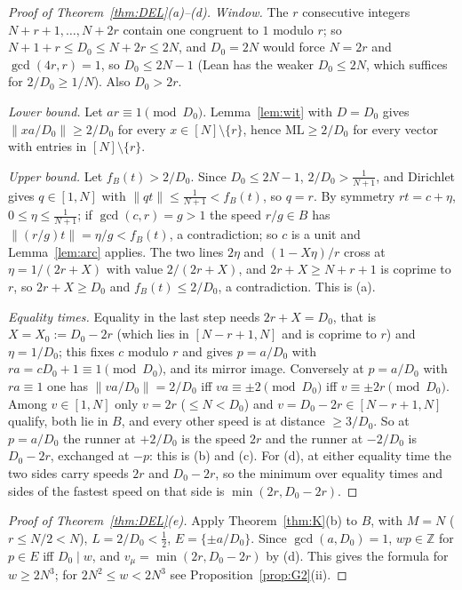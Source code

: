 \documentclass[11pt]{article}
\theoremstyle{definition}
\theoremstyle{remark}
\newcommand{\nd}[1]{\lVert #1\rVert}
\newcommand{\ML}{\mathrm{ML}}
\newcommand{\ZZ}{\mathbb{Z}}
\begin{document}
\begin{proof}[Proof of Theorem~\ref{thm:DEL}(a)--(d)]
\emph{Window.} The $r$ consecutive integers $N+r+1,\dots,N+2r$ contain one congruent to $1$ modulo $r$; so $N+1+r\le D_0\le N+2r\le2N$, and $D_0=2N$ would force $N=2r$ and $\gcd(4r,r)=1$, so $D_0\le2N-1$ (Lean has the weaker $D_0\le2N$, which suffices for $2/D_0\ge1/N$). Also $D_0>2r$.

\emph{Lower bound.} Let $ar\equiv1\pmod{D_0}$. Lemma~\ref{lem:wit} with $D=D_0$ gives $\nd{xa/D_0}\ge2/D_0$ for every $x\in[N]\setminus\{r\}$, hence $\ML\ge2/D_0$ for every vector with entries in $[N]\setminus\{r\}$.

\emph{Upper bound.} Let $f_B(t)>2/D_0$. Since $D_0\le2N-1$, $2/D_0>\frac1{N+1}$, and Dirichlet gives $q\in[1,N]$ with $\nd{qt}\le\frac1{N+1}<f_B(t)$, so $q=r$. By symmetry $rt=c+\eta$, $0\le\eta\le\frac1{N+1}$; if $\gcd(c,r)=g>1$ the speed $r/g\in B$ has $\nd{(r/g)t}=\eta/g<f_B(t)$, a contradiction; so $c$ is a unit and Lemma~\ref{lem:arc} applies. The two lines $2\eta$ and $(1-X\eta)/r$ cross at $\eta=1/(2r+X)$ with value $2/(2r+X)$, and $2r+X\ge N+r+1$ is coprime to $r$, so $2r+X\ge D_0$ and $f_B(t)\le2/D_0$, a contradiction. This is (a).

\emph{Equality times.} Equality in the last step needs $2r+X=D_0$, that is $X=X_0:=D_0-2r$ (which lies in $[N-r+1,N]$ and is coprime to $r$) and $\eta=1/D_0$; this fixes $c$ modulo $r$ and gives $p=a/D_0$ with $ra=cD_0+1\equiv1\pmod{D_0}$, and its mirror image. Conversely at $p=a/D_0$ with $ra\equiv1$ one has $\nd{va/D_0}=2/D_0$ iff $va\equiv\pm2\pmod{D_0}$ iff $v\equiv\pm2r\pmod{D_0}$. Among $v\in[1,N]$ only $v=2r$ ($\le N<D_0$) and $v=D_0-2r\in[N-r+1,N]$ qualify, both lie in $B$, and every other speed is at distance $\ge3/D_0$. So at $p=a/D_0$ the runner at $+2/D_0$ is the speed $2r$ and the runner at $-2/D_0$ is $D_0-2r$, exchanged at $-p$: this is (b) and (c). For (d), at either equality time the two sides carry speeds $2r$ and $D_0-2r$, so the minimum over equality times and sides of the fastest speed on that side is $\min(2r,D_0-2r)$.
\end{proof}

\begin{proof}[Proof of Theorem~\ref{thm:DEL}(e)]
Apply Theorem~\ref{thm:K}(b) to $B$, with $M=N$ ($r\le N/2<N$), $L=2/D_0<\frac12$, $E=\{\pm a/D_0\}$. Since $\gcd(a,D_0)=1$, $wp\in\ZZ$ for $p\in E$ iff $D_0\mid w$, and $v_\mu=\min(2r,D_0-2r)$ by (d). This gives the formula for $w\ge2N^3$; for $2N^2\le w<2N^3$ see Proposition~\ref{prop:G2}(ii).
\end{proof}
\end{document}
